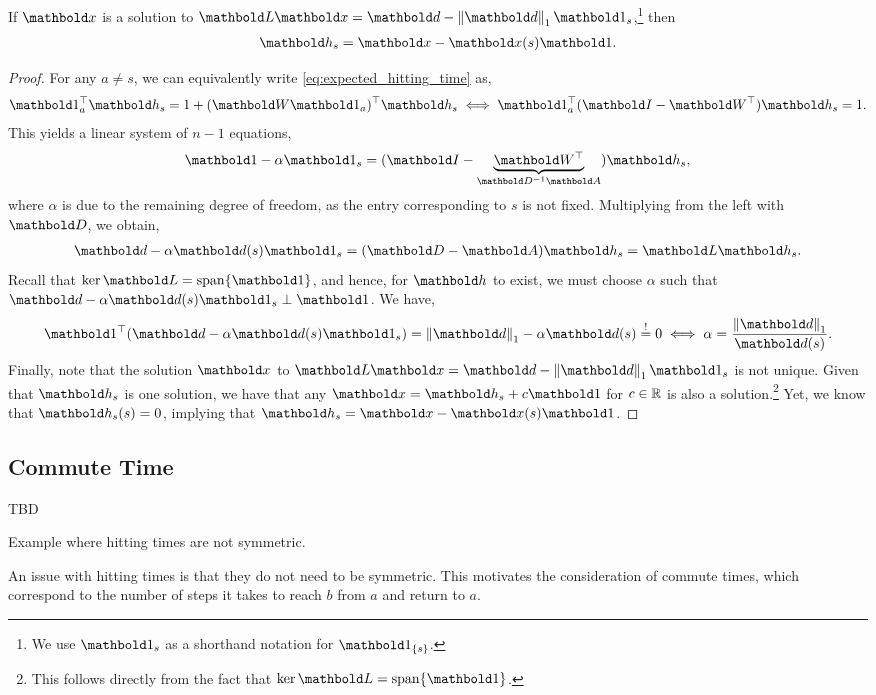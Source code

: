 \begin{lem}
If $\vx$ is a solution to $\mL\vx = \vd - \norm{\vd}_1 \vOne_s$,\footnote{We use $\vOne_s$ as a shorthand notation for $\vOne_{\{s\}}$.} then \begin{align}
    \vh_s = \vx - \vx(s)\vOne.
\end{align}
\end{lem}
\begin{proof}
For any $a \neq s$, we can equivalently write \cref{eq:expected_hitting_time} as, \begin{align*}
    \trans{\vOne_a}\vh_s = 1 + \trans{(\mW \vOne_a)}\vh_s \iff \trans{\vOne_a}(\mI - \trans{\mW})\vh_s = 1.
\end{align*} This yields a linear system of $n-1$ equations, \begin{align}
    \vOne - \alpha \vOne_s = (\mI - \underbrace{\trans{\mW}}_{\inv{\mD}\mA})\vh_s,
\end{align} where $\alpha$ is due to the remaining degree of freedom, as the entry corresponding to $s$ is not fixed. Multiplying from the left with $\mD$, we obtain, \begin{align*}
    \vd - \alpha \vd(s) \vOne_s = (\mD - \mA)\vh_s = \mL\vh_s.
\end{align*} Recall that $\ker{\mL} = \vspan\{\vOne\}$, and hence, for $\vh$ to exist, we must choose $\alpha$ such that $\vd - \alpha \vd(s) \vOne_s \perp \vOne$. We have, \begin{align*}
    \trans{\vOne}(\vd - \alpha \vd(s) \vOne_s) = \norm{\vd}_1 - \alpha \vd(s) \overset{!}{=} 0 \iff \alpha = \frac{\norm{\vd}_1}{\vd(s)}.
\end{align*} Finally, note that the solution $\vx$ to $\mL\vx = \vd - \norm{\vd}_1 \vOne_s$ is not unique. Given that $\vh_s$ is one solution, we have that any $\vx = \vh_s + c\vOne$ for $c \in \mathbb{R}$ is also a solution.\footnote{This follows directly from the fact that $\ker{\mL} = \vspan\{\vOne\}$.} Yet, we know that $\vh_s(s) = 0$, implying that $\vh_s = \vx - \vx(s)\vOne$.
\end{proof}

\subsection{Commute Time}

\begin{marginfigure}
TBD
\caption{Example where hitting times are not symmetric.}
\end{marginfigure}
An issue with hitting times is that they do not need to be symmetric. This motivates the consideration of commute times, which correspond to the number of steps it takes to reach $b$ from $a$ and return to $a$.

